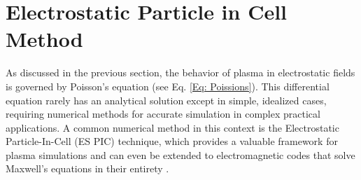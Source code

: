 \usetikzlibrary{decorations.pathreplacing}
\newcommand{\drawGrid}{
    \def\overlap{0.3}
    
    \draw[black, dashed, opacity=1] (0,0) grid (2,2);
    
    \draw[black, dashed, opacity=0.3] (2,2) -- (2+\overlap,2);   %
    \draw[black, dashed, opacity=0.3] (2,2) -- (2,2+\overlap);   %
    \draw[black, dashed, opacity=0.3] (0,2) -- (0-\overlap,2);   %
    \draw[black, dashed, opacity=0.3] (0,2) -- (0,2+\overlap);   %
    \draw[black, dashed, opacity=0.3] (2,0) -- (2+\overlap,0);   %
    \draw[black, dashed, opacity=0.3] (2,0) -- (2,0-\overlap);   %
    \draw[black, dashed, opacity=0.3] (0,0) -- (0-\overlap,0);   %
    \draw[black, dashed, opacity=0.3] (0,0) -- (0,0-\overlap);   %
    
    \draw[black, dashed, opacity=0.3] (1,2) -- (1,2+\overlap);   %
    \draw[black, dashed, opacity=0.3] (1,0) -- (1,0-\overlap);   %
    \draw[black, dashed, opacity=0.3] (2,1) -- (2+\overlap,1);   %
    \draw[black, dashed, opacity=0.3] (0,1) -- (0-\overlap,1);   %
}

\section{Electrostatic Particle in Cell Method}
\label{sec: ES PIC}
As discussed in the previous section, the behavior of plasma in electrostatic fields is governed by Poisson’s equation (see Eq. \ref{Eq: Poissions}). This differential equation rarely has an analytical solution except in simple, idealized cases, requiring numerical methods for accurate simulation in complex practical applications. A common numerical method in this context is the Electrostatic Particle-In-Cell (\acs{ES PIC}) technique, which provides a valuable framework for plasma simulations and can even be extended to electromagnetic codes that solve Maxwell’s equations in their entirety \cite{brieda_plasma_2019}.

